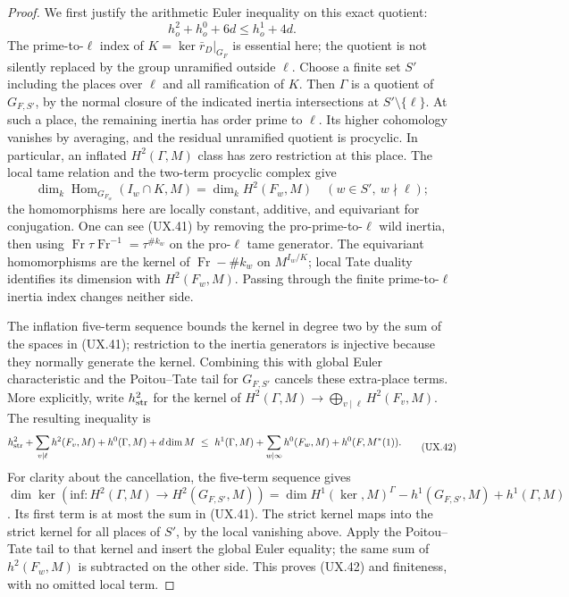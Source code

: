 \begin{proof}
We first justify the arithmetic Euler inequality
on this exact quotient:
\[
             h^2_o+h^0_o+6d\le h^1_o+4d .
 \tag{UX.40}
\]
The prime-to-$\ell$ index of
$K=\ker\bar r_D|_{G_F}$ is essential here;
the quotient is not silently replaced by
the group unramified outside $\ell$.
Choose a finite set $S'$ including the places
over $\ell$ and all ramification of $K$.
Then $\Gamma$ is a quotient of $G_{F,S'}$,
by the normal closure of the indicated
inertia intersections at $S'\setminus\{\ell\}$.
At such a place, the remaining inertia has
order prime to $\ell$.  Its higher cohomology
vanishes by averaging, and the residual
unramified quotient is procyclic.  In
particular, an inflated $H^2(\Gamma,M)$ class
has zero restriction at this place.
The local tame relation and the two-term
procyclic complex give
\[
 \dim_k\operatorname{Hom}_{G_{F_w}}
       (I_w\cap K,M)
       =\dim_k H^2(F_w,M)
            \quad(w\in S',\ w\nmid\ell);
 \tag{UX.41}
\]
the homomorphisms here are locally constant,
additive, and equivariant for conjugation.
One can see (UX.41) by removing the
pro-prime-to-$\ell$ wild inertia, then using
$\operatorname{Fr}\tau\operatorname{Fr}^{-1}
=\tau^{\#k_w}$ on the pro-$\ell$ tame
generator.  The equivariant homomorphisms
are the kernel of
$\operatorname{Fr}-\#k_w$ on $M^{I_w/K}$;
local Tate duality identifies its dimension
with $H^2(F_w,M)$.  Passing through the
finite prime-to-$\ell$ inertia index changes
neither side.

The inflation five-term sequence bounds the
kernel in degree two by the sum of the spaces
in (UX.41); restriction to the inertia
generators is injective because they normally
generate the kernel.  Combining this with
global Euler characteristic and the
Poitou--Tate tail for $G_{F,S'}$ cancels
these extra-place terms.  More explicitly,
write $h^2_{\rm str}$ for the kernel of
$H^2(\Gamma,M)\to\bigoplus_{v\mid\ell}H^2(F_v,M)$.
The resulting inequality is
\[
 \begin{split}
 h^2_{\rm str}+\sum_{v\mid\ell}h^2(F_v,M)
       +h^0(\Gamma,M)+d\dim M
 \ \le\ h^1(\Gamma,M)
       +\sum_{w\mid\infty}h^0(F_w,M)
       +h^0(F,M^*(1)).
 \end{split}
 \tag{UX.42}
\]
For clarity about the cancellation, the five-term
sequence gives
$\dim\ker(\mathrm{inf}:H^2(\Gamma,M)\to H^2(G_{F,S'},M))
=\dim H^1(\ker,\!M)^{\Gamma}
 -h^1(G_{F,S'},M)+h^1(\Gamma,M)$.
Its first term is at most the sum in (UX.41).
The strict kernel maps into the strict kernel
for all places of $S'$, by the local vanishing
above.  Apply the Poitou--Tate tail to that
kernel and insert the global Euler equality;
the same sum of $h^2(F_w,M)$ is subtracted
on the other side.  This proves (UX.42)
and finiteness, with no omitted local term.


\end{proof}
